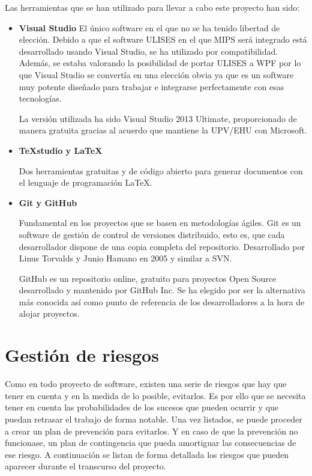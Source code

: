 Las herramientas que se han utilizado para llevar a cabo este proyecto han sido:
\begin{itemize}
    \item 
    \textbf{Visual Studio}
    El \'unico software en el que no se ha tenido libertad de elecci\'on. Debido a que el 
    software ULISES en el que MIPS ser\'a integrado est\'a desarrollado usando Visual Studio, se ha utilizado por 
    compatibilidad. Adem\'as, se estaba
    valorando la posibilidad de portar ULISES a WPF por lo que Visual Studio se 
    convert\'ia en una elecci\'on
    obvia ya que es un software muy potente dise\~nado para trabajar e integrarse perfectamente con 
    esas tecnolog\'ias.

    La versi\'on utilizada ha sido Visual Studio 2013 Ultimate, proporcionado de manera gratuita 
    gracias al acuerdo que mantiene 
    la UPV/EHU con Microsoft.
    
    \item 
    \textbf{TeXstudio y \LaTeX}
    
    Dos herramientas gratuitas y de código abierto para generar documentos con el lenguaje de 
    programaci\'on \LaTeX.
    
    \item
    \textbf{Git y GitHub}
    
    Fundamental en los proyectos que se basen en metodologías ágiles. Git es un software de 
    gestión de control de versiones 
    distribuido, esto es, que cada desarrollador dispone de una copia completa del repositorio. 
    Desarrollado por Linus Torvalds y 
    Junio Hamano en 2005 y similar a SVN.
    
    GitHub es un repositorio online, gratuito para proyectos Open Source desarrollado y mantenido 
    por GitHub Inc. Se ha elegido
    por ser la alternativa m\'as conocida as\'i como punto de referencia de los desarrolladores a 
    la hora de alojar proyectos.
    
\end{itemize}

\section{Gesti\'{o}n de riesgos}
Como en todo proyecto de software, existen una serie de riesgos que hay que tener en cuenta y en 
la medida de lo posible,
evitarlos. Es por ello que se necesita tener en cuenta las probabilidades de los sucesos que 
pueden ocurrir y que puedan retrasar el trabajo de forma notable. Una vez
listados, se puede proceder a crear un plan de prevención para evitarlos. Y en caso de que la 
prevenci\'on no
funcionase, un plan de contingencia que pueda amortiguar las consecuencias de ese riesgo. A 
continuación
se listan de forma detallada los riesgos que pueden aparecer durante el transcurso del proyecto.

